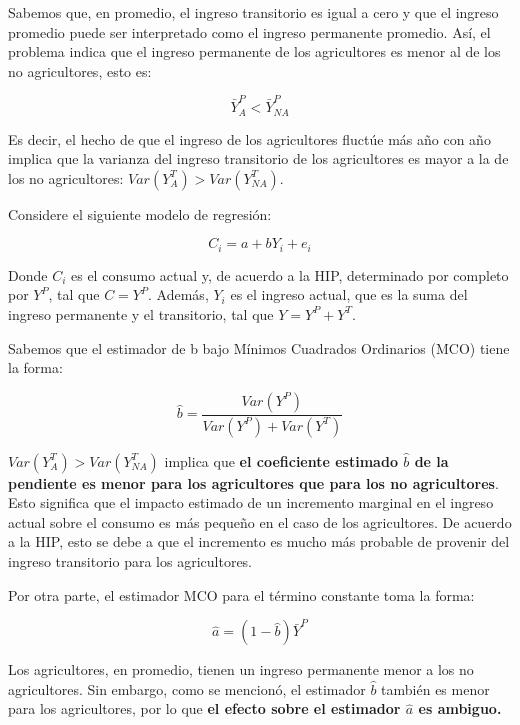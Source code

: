 \documentclass[
]{article}
\begin{document}
Sabemos que, en promedio, el ingreso transitorio es igual a cero y que
el ingreso promedio puede ser interpretado como el ingreso permanente
promedio. Así, el problema indica que el ingreso permanente de los
agricultores es menor al de los no agricultores, esto es:

\setcounter{equation}{0}

\begin{equation}
\bar{Y}_{A}^P < \bar{Y}_{NA}^P 
\end{equation}

Es decir, el hecho de que el ingreso de los agricultores fluctúe más año
con año implica que la varianza del ingreso transitorio de los
agricultores es mayor a la de los no agricultores:
\(Var(Y^T_{A}) > Var(Y_{NA}^T)\).

Considere el siguiente modelo de regresión:

\begin{equation}
C_{i} = a + bY_{i} + e_{i}
\end{equation}

Donde \(C_{i}\) es el consumo actual y, de acuerdo a la HIP, determinado
por completo por \(Y^P\), tal que \(C = Y^P\). Además, \(Y_{i}\) es el
ingreso actual, que es la suma del ingreso permanente y el transitorio,
tal que \(Y = Y^P + Y^T\).

Sabemos que el estimador de b bajo Mínimos Cuadrados Ordinarios (MCO)
tiene la forma:

\begin{equation}
\hat{b} = \frac{Var(Y^P)}{Var(Y^P) + Var(Y^T)}
\end{equation}

\(Var(Y_{A}^T)>Var(Y_{NA}^T)\) implica que \textbf{el coeficiente
estimado \(\hat{b}\) de la pendiente es menor para los agricultores que
para los no agricultores}. Esto significa que el impacto estimado de un
incremento marginal en el ingreso actual sobre el consumo es más pequeño
en el caso de los agricultores. De acuerdo a la HIP, esto se debe a que
el incremento es mucho más probable de provenir del ingreso transitorio
para los agricultores.

Por otra parte, el estimador MCO para el término constante toma la
forma:

\begin{equation}
\hat{a} = (1-\hat{b})\bar{Y}^P
\end{equation}

Los agricultores, en promedio, tienen un ingreso permanente menor a los
no agricultores. Sin embargo, como se mencionó, el estimador \(\hat{b}\)
también es menor para los agricultores, por lo que \textbf{el efecto
sobre el estimador \(\hat{a}\) es ambiguo.}
\end{document}

